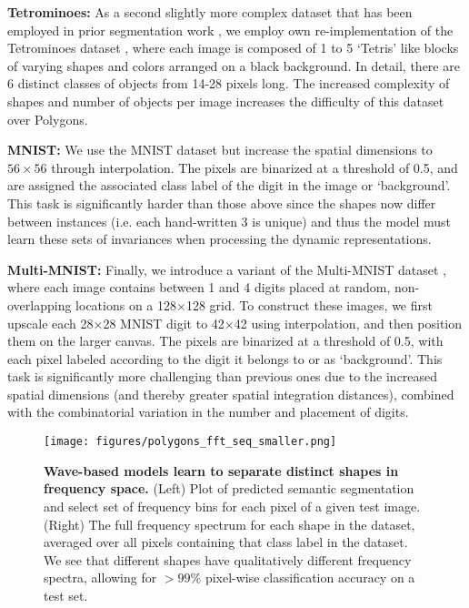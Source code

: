 \textbf{Tetrominoes:} As a second slightly more complex dataset  that has been employed in prior segmentation work \citep{miyato_artificial_2024}, we employ own re-implementation of the Tetrominoes dataset \citep{multiobjectdatasets19}, where each image is composed of 1 to 5 `Tetris' like blocks of varying shapes and colors arranged on a black background. In detail, there are 6 distinct classes of objects from 14-28 pixels long. The increased complexity of shapes and number of objects per image increases the difficulty of this dataset over Polygons.  

\textbf{MNIST:} We use the MNIST dataset \citep{lecun1998mnist} but increase the spatial dimensions to $56\times56$ through interpolation. The pixels are binarized at a threshold of 0.5, and are assigned the associated class label of the digit in the image or `background'. This task is significantly harder than those above since the shapes now differ between instances (i.e. each hand-written 3 is unique) and thus the model must learn these sets of invariances when processing the dynamic representations. 

\textbf{Multi-MNIST:} Finally, we introduce a variant of the Multi-MNIST dataset \citep{sabour2017dynamic}, where each image contains between 1 and 4 digits placed at random, non-overlapping locations on a 128×128 grid. To construct these images, we first upscale each 28×28 MNIST digit to 42×42 using interpolation, and then position them on the larger canvas. The pixels are binarized at a threshold of 0.5, with each pixel labeled according to the digit it belongs to or as `background'. This task is significantly more challenging than previous ones due to the increased spatial dimensions (and thereby greater spatial integration distances), combined with the combinatorial variation in the number and placement of digits.


\begin{figure*}[t]
    \centering
    \texttt{[image: figures/polygons\_fft\_seq\_smaller.png]} 
    \vspace{-5mm}
    \caption{\textbf{Wave-based models learn to separate distinct shapes in frequency space.} (Left) Plot of predicted semantic segmentation and select set of frequency bins for each pixel of a given test image. (Right) The full frequency spectrum for each shape in the dataset, averaged over all pixels containing that class label in the dataset. We see that different shapes have qualitatively different frequency spectra, allowing for $>99\%$ pixel-wise classification accuracy on a test set.}
    \label{fig:polygons_fft}
\end{figure*}



